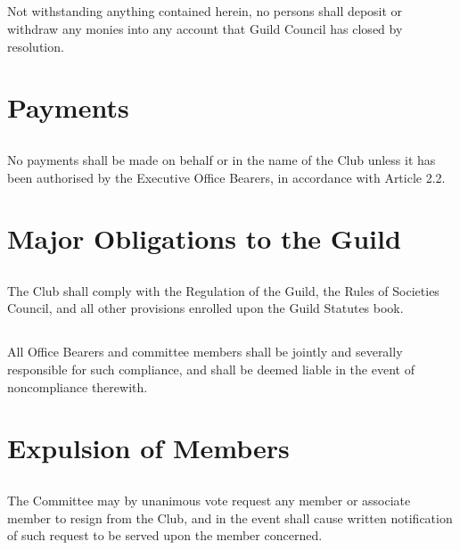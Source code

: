 \documentclass[10.5pt]{article}
\begin{document}
\subsection{} Not withstanding anything contained herein, no persons shall deposit or withdraw any monies into any account that Guild Council has closed by resolution.
\newline


\section{Payments} 
\subsection{} No payments shall be made on behalf or in the name of the Club unless it has been authorised by the Executive Office Bearers, in accordance with Article 2.2.
\newline


\section{Major Obligations to the Guild}
\subsection{} The Club shall comply with the Regulation of the Guild, the Rules of Societies Council, and all other provisions enrolled upon the Guild Statutes book. 
\subsection{} All Office Bearers and committee members shall be jointly and severally responsible for such compliance, and shall be deemed liable in the event of noncompliance therewith. 
\newline


\section{Expulsion of Members}
\subsection{} The Committee may by unanimous vote request any member or associate member to resign from the Club, and in the event shall cause written notification of such request to be served upon the member concerned. 
\end{document}
